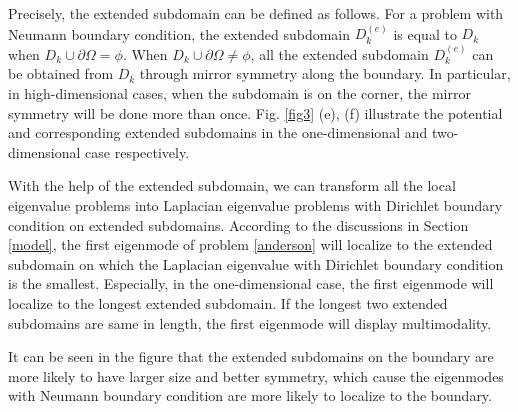 \documentclass[a4paper,11pt]{article}
\begin{document}
Precisely, the extended subdomain can be defined as follows. For a problem with Neumann boundary condition, the extended subdomain $D_k^{(e)}$ is equal to $D_k$ when $D_k \cup \partial \Omega = \phi$. When $D_k \cup \partial \Omega \neq \phi$, all the extended subdomain $D_k^{(e)}$ can be obtained from $D_k$ through mirror symmetry along the boundary. In particular, in high-dimensional cases, when the subdomain is on the corner, the mirror symmetry will be done more than once. Fig. \ref{fig3} (e), (f) illustrate the potential and corresponding extended subdomains in the one-dimensional and two-dimensional case respectively.

With the help of the extended subdomain, we can transform all the local eigenvalue problems into Laplacian eigenvalue problems with Dirichlet boundary condition on extended subdomains. According to the discussions in Section \ref{model}, the first eigenmode of problem \eqref{anderson} will localize to the extended subdomain on which the Laplacian eigenvalue with Dirichlet boundary condition is the smallest. Especially, in the one-dimensional case, the first eigenmode will localize to the longest extended subdomain. If the longest two extended subdomains are same in length, the first eigenmode will display multimodality.

It can be seen in the figure that the extended subdomains on the boundary are more likely to have larger size and better symmetry, which cause the eigenmodes with Neumann boundary condition are more likely to localize to the boundary.
\end{document}
